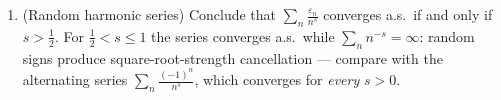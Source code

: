 \begin{problem}
\begin{enumerate}[resume]
\[        \P\bigl(Z > \theta\,\E Z\bigr) \;\geq\; (1 -
        \theta)^2\,\frac{(\E Z)^2}{\E Z^2}
        \]
        \emph{(split $\E Z$ at the level $\theta\E Z$ and
        apply Cauchy--Schwarz to the upper piece)}.
        (b) Show $\E T_n^4 \leq 3s_n^4$.
        (c) Deduce $\P\bigl(\abs{T_n} > \frac{s_n}2\bigr)
        \geq \frac3{16}$ and conclude that
        $\sum_nx_n\varepsilon_n$ diverges a.s.; hence the
        dichotomy
        \[
        \sum_nx_n\varepsilon_n\ \text{converges a.s.}
        \iff \sum_nx_n^2 < \infty .
        \]
  \item (Random harmonic series) Conclude that
        $\sum_n\frac{\varepsilon_n}{n^s}$ converges a.s.\
        if and only if $s > \frac12$. For $\frac12 < s \leq
        1$ the series converges a.s.\ while
        $\sum_nn^{-s} = \infty$: random signs produce
        square-root-strength cancellation --- compare with
        the alternating series $\sum_n\frac{(-1)^n}{n^s}$,
        which converges for \emph{every} $s > 0$.
\end{enumerate}


\end{problem}

